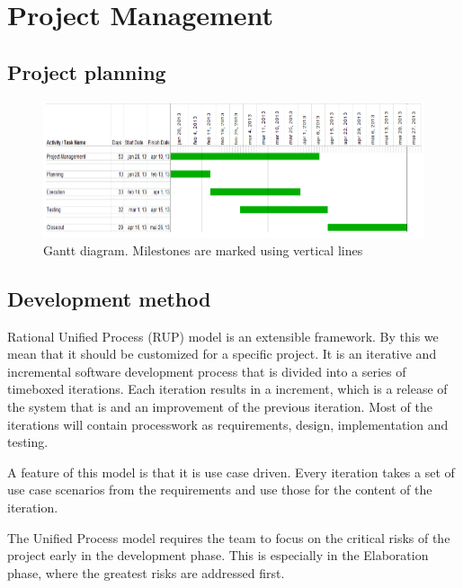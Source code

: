 \chapter{Project Management}

\section{Project planning}
\begin{figure}[H]
\includegraphics[scale=0.8]{images/gantt-diagram.png}
\caption{Gantt diagram. Milestones are marked using vertical lines}
\end{figure}

\section{Development method}

Rational Unified Process (RUP) model is an extensible framework. By this we mean that it should be customized for a specific project.
It is an iterative and incremental software development process that is divided into a series of timeboxed iterations.
Each iteration results in a increment, which is a release of the system that is and an improvement of the previous iteration.
Most of the iterations will contain processwork as requirements, design, implementation and testing.

A feature of this model is that it is use case driven. Every iteration takes a set of use case scenarios from the requirements and use those for the content of the iteration.

The Unified Process model requires the team to focus on the critical risks of the project early in the development phase. This is especially in the Elaboration phase, where the greatest risks are addressed first.

